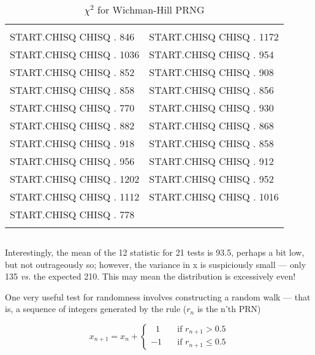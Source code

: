 
\begin{table}
    \caption{$\chi^2$ for Wichman-Hill PRNG}
    \label{tbl:03_02}
        \setlength{\tabcolsep}{20pt}
        \begin{tabular}{|ll|}
            \hline & \\
            START.CHISQ CHISQ . 846   &  START.CHISQ CHISQ . 1172  \\ 
            START.CHISQ CHISQ . 1036  &  START.CHISQ CHISQ . 954   \\
            START.CHISQ CHISQ . 852   &  START.CHISQ CHISQ . 908   \\
            START.CHISQ CHISQ . 858   &  START.CHISQ CHISQ . 856   \\
            START.CHISQ CHISQ . 770   &  START.CHISQ CHISQ . 930   \\
            START.CHISQ CHISQ . 882   &  START.CHISQ CHISQ . 868   \\
            START.CHISQ CHISQ . 918   &  START.CHISQ CHISQ . 858   \\
            START.CHISQ CHISQ . 956   &  START.CHISQ CHISQ . 912   \\
            START.CHISQ CHISQ . 1202  &  START.CHISQ CHISQ . 952   \\
            START.CHISQ CHISQ . 1112  &  START.CHISQ CHISQ . 1016  \\
            START.CHISQ CHISQ . 778   & \\
            & \\
            \hline
        \end{tabular} 
\end{table}

\begin{verbatim}
\end{verbatim} 
 
Interestingly, the mean of the 12 statistic for 21 tests is 93.5,
perhaps a bit low, but not outrageously so; however, the variance
in x is suspiciously small — only 135 \textit{vs.} the expected 210. This
may mean the distribution is excessively even!

One very useful test for randomness involves constructing a
random walk — that is, a sequence of integers generated by the
rule ($r_n$ is the n'th PRN)

\begin{equation}
x_{n+1}=x_n+
\begin{cases}
    \;\; 1 & \quad \text{if } r_{n+1} > 0.5 \\
    -1 & \quad \text{if }  r_{n+1} \leq 0.5
    \end{cases}
\end{equation}

